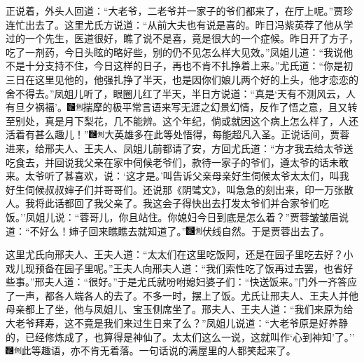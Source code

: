 正说着，外头人回道：``大老爷，二老爷并一家子的爷们都来了，在厅上呢。''贾珍连忙出去了。这里尤氏方说道：``从前大夫也有说是喜的。昨日冯紫英荐了他从学过的一个先生，医道很好，瞧了说不是喜，竟是很大的一个症候。昨日开了方子，吃了一剂药，今日头眩的略好些，别的仍不见怎么样大见效。''凤姐儿道：``我说他不是十分支持不住，今日这样的日子，再也不肯不扎挣着上来。''尤氏道：``你是初三日在这里见他的，他强扎挣了半天，也是因你们娘儿两个好的上头，他才恋恋的舍不得去。''凤姐儿听了，眼圈儿红了半天，半日方说道：``真是`天有不测风云，人有旦夕祸福'。{\includegraphics[width=3mm]{../Images/00006}\includegraphics[width=3mm]{../Images/00011}\footnotesize \kaishu 揣摩的极平常言语来写无涯之幻景幻情，反作了悟之意，且又转至别处，真是月下梨花，几不能辨。}这个年纪，倘或就因这个病上怎么样了，人还活着有甚么趣儿！''{\includegraphics[width=3mm]{../Images/00006}\includegraphics[width=3mm]{../Images/00011}\footnotesize \kaishu 大英雄多在此等处悟得，每能超凡入圣。}正说话间，贾蓉进来，给邢夫人、王夫人、凤姐儿前都请了安，方回尤氏道：``方才我去给太爷送吃食去，并回说我父亲在家中伺候老爷们，款待一家子的爷们，遵太爷的话未敢来。太爷听了甚喜欢，说：`这才是。'叫告诉父亲母亲好生伺候太爷太太们，叫我好生伺候叔叔婶子们并哥哥们。还说那《阴骘文》，叫急急的刻出来，印一万张散人。我将此话都回了我父亲了。我这会子得快出去打发太爷们并合家爷们吃饭。''凤姐儿说：``蓉哥儿，你且站住。你媳妇今日到底是怎么着？''贾蓉皱皱眉说道：``不好么！婶子回来瞧瞧去就知道了。''{\includegraphics[width=3mm]{../Images/00006}\includegraphics[width=3mm]{../Images/00011}\footnotesize \kaishu 伏线自然。}于是贾蓉出去了。

这里尤氏向邢夫人、王夫人道：``太太们在这里吃饭阿，还是在园子里吃去好？小戏儿现预备在园子里呢。''王夫人向邢夫人道：``我们索性吃了饭再过去罢，也省好些事。''邢夫人道：``很好。''于是尤氏就吩咐媳妇婆子们：``快送饭来。''门外一齐答应了一声，都各人端各人的去了。不多一时，摆上了饭。尤氏让邢夫人、王夫人并他母亲都上了坐，他与凤姐儿、宝玉侧席坐了。邢夫人、王夫人道：``我们来原为给大老爷拜寿，这不竟是我们来过生日来了么？''凤姐儿说道：``大老爷原是好养静的，已经修炼成了，也算得是神仙了。太太们这么一说，这就叫作`心到神知'了。''{\includegraphics[width=3mm]{../Images/00006}\includegraphics[width=3mm]{../Images/00011}\footnotesize \kaishu 此等趣语，亦不肯无着落。}一句话说的满屋里的人都笑起来了。

